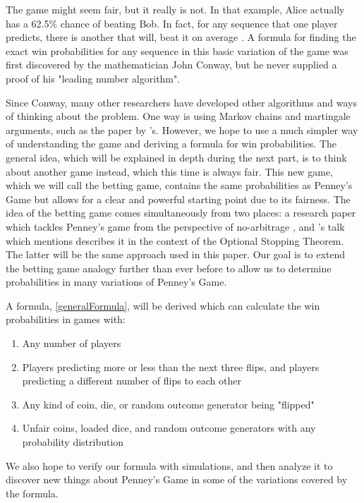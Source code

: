 \documentclass[english,12pt,a4paper,final]{article}
\begin{document}
The game might seem fair, but it really is not. In that example, Alice actually has a 62.5\% chance of beating Bob. In fact, for any sequence that one player predicts, there is another that will, beat it on average \parencite{penney}. A formula for finding the exact win probabilities for any sequence in this basic variation of the game was first discovered by the mathematician John Conway, but he never supplied a proof of his "leading number algorithm".

Since Conway, many other researchers have developed other algorithms and ways of thinking about the problem. One way is using Markov chains and martingale arguments, such as the paper by \textcite{markov}'s. However, we hope to use a much simpler way of understanding the game and deriving a formula for win probabilities. The general idea, which will be explained in depth during the next part, is to think about another game instead, which this time is always fair. This new game, which we will call the betting game, contains the same probabilities as Penney's Game but allows for a clear and powerful starting point due to its fairness. The idea of the betting game comes simultaneously from two places: a research paper which tackles Penney's game from the perspective of no-arbitrage \parencite{miller}, and \textcite{chung}'s talk which mentions describes it in the context of the Optional Stopping Theorem. The latter will be the same approach used in this paper. Our goal is to extend the betting game analogy further than ever before to allow us to determine probabilities in many variations of Penney's Game.

A formula, \eqref{generalFormula}, will be derived which can calculate the win probabilities in games with:

\begin{enumerate}
	\item Any number of players
	\item Players predicting more or less than the next three flips, and  players predicting a different number of flips to each other
	\item Any kind of coin, die, or random outcome generator being "flipped"
	\item Unfair coins, loaded dice, and random outcome generators with any probability distribution
\end{enumerate}

We also hope to verify our formula with simulations, and then analyze it to discover new things about Penney's Game in some of the variations covered by the formula.
\end{document}

